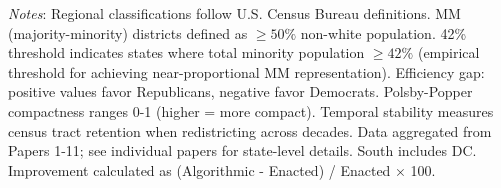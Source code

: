 \begin{table}[htbp]
\footnotesize
\textit{Notes}: Regional classifications follow U.S. Census Bureau definitions. MM (majority-minority) districts defined as $\geq 50\%$ non-white population. 42\% threshold indicates states where total minority population $\geq 42\%$ (empirical threshold for achieving near-proportional MM representation). Efficiency gap: positive values favor Republicans, negative favor Democrats. Polsby-Popper compactness ranges 0-1 (higher = more compact). Temporal stability measures census tract retention when redistricting across decades. Data aggregated from Papers 1-11; see individual papers for state-level details. South includes DC. Improvement calculated as (Algorithmic - Enacted) / Enacted × 100.

\end{table}
